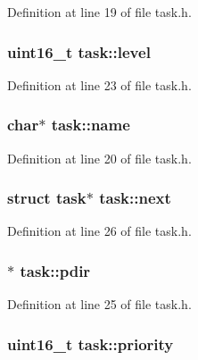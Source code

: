 Definition at line 19 of file task.\+h.

\subsubsection[{\texorpdfstring{level}{level}}]{\setlength{\rightskip}{0pt plus 5cm}uint16\+\_\+t task\+::level}\hypertarget{structtask_a533c24b91bc1238517c1c42b53b3b8f0}{}\label{structtask_a533c24b91bc1238517c1c42b53b3b8f0}


Definition at line 23 of file task.\+h.

\subsubsection[{\texorpdfstring{name}{name}}]{\setlength{\rightskip}{0pt plus 5cm}char$\ast$ task\+::name}\hypertarget{structtask_a9aef5dbd16cfbbdb0c8b13416549a07f}{}\label{structtask_a9aef5dbd16cfbbdb0c8b13416549a07f}


Definition at line 20 of file task.\+h.

\subsubsection[{\texorpdfstring{next}{next}}]{\setlength{\rightskip}{0pt plus 5cm}struct {\bf task}$\ast$ task\+::next}\hypertarget{structtask_a3f2c7149983c28824baf1aebdfa7af98}{}\label{structtask_a3f2c7149983c28824baf1aebdfa7af98}


Definition at line 26 of file task.\+h.

\subsubsection[{\texorpdfstring{pdir}{pdir}}]{$\ast$ task\+::pdir}\hypertarget{structtask_a9c01e75ea4d3ddf248a78c9d70f50237}{}\label{structtask_a9c01e75ea4d3ddf248a78c9d70f50237}


Definition at line 25 of file task.\+h.

\subsubsection[{\texorpdfstring{priority}{priority}}]{\setlength{\rightskip}{0pt plus 5cm}uint16\+\_\+t task\+::priority}\hypertarget{structtask_ac62cef90688fbf752e32cebb122f178a}{}\label{structtask_ac62cef90688fbf752e32cebb122f178a}


